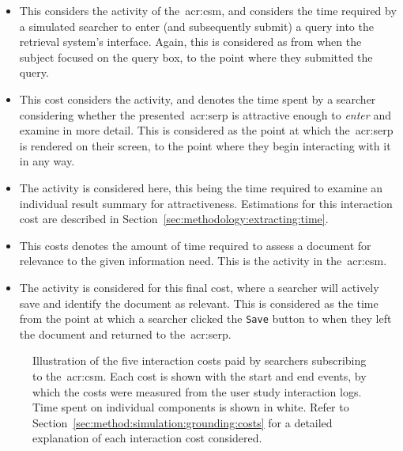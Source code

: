 \begin{itemize}
    \item{ This considers the  activity of the~\gls{acr:csm}, and considers the time required by a simulated searcher to enter (and subsequently submit) a query into the retrieval system's interface. Again, this is considered as from when the subject focused on the query box, to the point where they submitted the query.}
    \item{ This cost considers the  activity, and denotes the time spent by a searcher considering whether the presented~\gls{acr:serp} is attractive enough to \emph{enter} and examine in more detail. This is considered as the point at which the~\gls{acr:serp} is rendered on their screen, to the point where they begin interacting with it in any way.}
    \item{ The  activity is considered here, this being the time required to examine an individual result summary for attractiveness. Estimations for this interaction cost are described in Section~\ref{sec:methodology:extracting:time}.}
    \item{ This costs denotes the amount of time required to assess a document for relevance to the given information need. This is the  activity in the~\gls{acr:csm}.}
    \item{ The  activity is considered for this final cost, where a searcher will actively save and identify the document as relevant. This is considered as the time from the point at which a searcher clicked the \texttt{Save} button to when they left the document and returned to the~\gls{acr:serp}.}
\end{itemize}

\begin{figure}[t!]
    \centering
    \caption[Interaction costs illustrated throughout a search session]{Illustration of the five interaction costs paid by searchers subscribing to the~\gls{acr:csm}. Each cost is shown with the start and end events, by which the costs were measured from the user study interaction logs. Time spent on individual components is shown in white. Refer to Section~\ref{sec:method:simulation:grounding:costs} for a detailed explanation of each interaction cost considered.}
    \label{fig:costs}
\end{figure}

